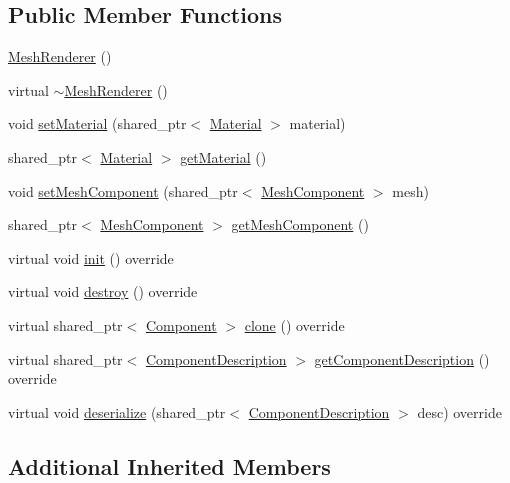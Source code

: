 \subsection*{Public Member Functions}
\begin{DoxyCompactItemize}
\item 
\hyperlink{class_mesh_renderer_aa928cebc7dc3602f61bf676761476fb2}{Mesh\+Renderer} ()
\item 
virtual \hyperlink{class_mesh_renderer_aeae128e155e478309aa8fd434abc7892}{$\sim$\+Mesh\+Renderer} ()
\item 
void \hyperlink{class_mesh_renderer_a7680dd341fa2b5ad4b31e9d3c25918f3}{set\+Material} (shared\+\_\+ptr$<$ \hyperlink{class_material}{Material} $>$ material)
\item 
shared\+\_\+ptr$<$ \hyperlink{class_material}{Material} $>$ \hyperlink{class_mesh_renderer_ab9c30678cf66a6fb3b8de32ab03c6a0b}{get\+Material} ()
\item 
void \hyperlink{class_mesh_renderer_ac750721941d7615e7443f459d04c5c60}{set\+Mesh\+Component} (shared\+\_\+ptr$<$ \hyperlink{class_mesh_component}{Mesh\+Component} $>$ mesh)
\item 
shared\+\_\+ptr$<$ \hyperlink{class_mesh_component}{Mesh\+Component} $>$ \hyperlink{class_mesh_renderer_a395bef0a7ce1b5f8973ac690fd7f1b2c}{get\+Mesh\+Component} ()
\item 
virtual void \hyperlink{class_mesh_renderer_ae77ac8e3b28e1890771860d5726fe043}{init} () override
\item 
virtual void \hyperlink{class_mesh_renderer_acb0c4dc40c30d70157adb51612e08013}{destroy} () override
\item 
virtual shared\+\_\+ptr$<$ \hyperlink{class_component}{Component} $>$ \hyperlink{class_mesh_renderer_a78a5a5b66bb12c2b50f5356292afd93a}{clone} () override
\item 
virtual shared\+\_\+ptr$<$ \hyperlink{class_component_description}{Component\+Description} $>$ \hyperlink{group__serialization__functions_gaf9b3799dcfb2bc87f5ce21c34c9fbaff}{get\+Component\+Description} () override
\item 
virtual void \hyperlink{group__serialization__functions_ga210ca500925eeb32174581ef37ea5b59}{deserialize} (shared\+\_\+ptr$<$ \hyperlink{class_component_description}{Component\+Description} $>$ desc) override
\end{DoxyCompactItemize}
\subsection*{Additional Inherited Members}


